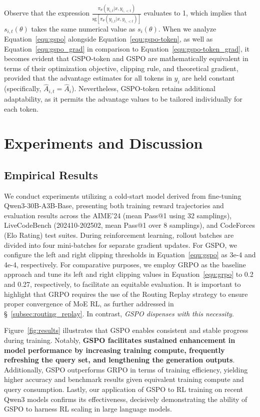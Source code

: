 Observe that the expression $\frac{ \pi_{\theta} (y_{i,t} | x, y_{i,<t}) }{ \mathrm{sg} \left[ \pi_{\theta} (y_{i,t} | x, y_{i,<t}) \right] }$ evaluates to 1, which implies that $s_{i,t}(\theta)$ takes the same numerical value as $s_{i}(\theta)$. When we analyze Equation~\eqref{equ:gspo} alongside Equation~\eqref{equ:gspo-token}, as well as Equation~\eqref{equ:gspo_grad} in comparison to Equation~\eqref{equ:gspo-token_grad}, it becomes evident that GSPO-token and GSPO are mathematically equivalent in terms of their optimization objective, clipping rule, and theoretical gradient, provided that the advantage estimates for all tokens in $y_i$ are held constant (specifically, $\widehat{A}_{i,t} = \widehat{A}_{i}$). Nevertheless, GSPO-token retains additional adaptability, as it permits the advantage values to be tailored individually for each token.

\section{Experiments and Discussion}

\subsection{Empirical Results}

We conduct experiments utilizing a cold-start model derived from fine-tuning Qwen3-30B-A3B-Base, presenting both training reward trajectories and evaluation results across the AIME'24 (mean Pass@1 using 32 samplings), LiveCodeBench (202410-202502, mean Pass@1 over 8 samplings), and CodeForces (Elo Rating) test suites. During reinforcement learning, rollout batches are divided into four mini-batches for separate gradient updates. For GSPO, we configure the left and right clipping thresholds in Equation~\eqref{equ:gspo} as 3e-4 and 4e-4, respectively. For comparative purposes, we employ GRPO as the baseline approach and tune its left and right clipping values in Equation~\eqref{equ:grpo} to 0.2 and 0.27, respectively, to facilitate an equitable evaluation. It is important to highlight that GRPO requires the use of the Routing Replay strategy to ensure proper convergence of MoE RL, as further addressed in \S~\ref{subsec:routing_replay}. In contrast, \textit{GSPO dispenses with this necessity}.

Figure~\ref{fig:results} illustrates that GSPO enables consistent and stable progress during training. Notably, \textbf{GSPO facilitates sustained enhancement in model performance by increasing training compute, frequently refreshing the query set, and lengthening the generation outputs}. Additionally, GSPO outperforms GRPO in terms of training efficiency, yielding higher accuracy and benchmark results given equivalent training compute and query consumption. Lastly, our application of GSPO to RL training on recent Qwen3 models confirms its effectiveness, decisively demonstrating the ability of GSPO to harness RL scaling in large language models.

